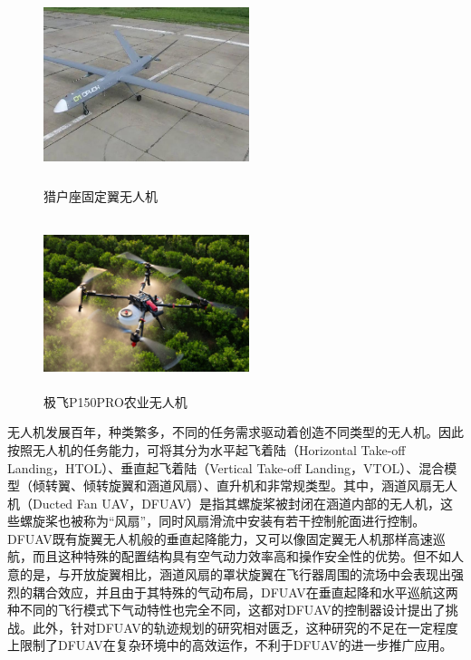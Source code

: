 \begin{figure}[htbp]
	\centering
	\begin{minipage}[c]{0.5\textwidth} %
		\centering
		\includegraphics[width=6cm,height=5cm]{Fig/Orion.jpg}
		\caption{\label{Orion}猎户座固定翼无人机}
	\end{minipage}%
	\begin{minipage}[c]{0.5\textwidth}
		\centering
		\includegraphics[width=6cm,height=5cm]{Fig/P150PRO.png}
		\caption{\label{P150PRO}极飞P150PRO农业无人机}
	\end{minipage}
\end{figure}

无人机发展百年，种类繁多，不同的任务需求驱动着创造不同类型的无人机。因此按照无人机的任务能力，可将其分为水平起飞着陆（Horizontal Take-off Landing，HTOL）、垂直起飞着陆（Vertical Take-off Landing，VTOL）、混合模型（倾转翼、倾转旋翼和涵道风扇）、直升机和非常规类型\cite{hassanalianClassificationsApplicationsDesign2017}。其中，涵道风扇无人机（Ducted Fan UAV，DFUAV）是指其螺旋桨被封闭在涵道内部的无人机，这些螺旋桨也被称为“风扇”，同时风扇滑流中安装有若干控制舵面进行控制。DFUAV既有旋翼无人机般的垂直起降能力，又可以像固定翼无人机那样高速巡航，而且这种特殊的配置结构具有空气动力效率高和操作安全性的优势\cite{johnsonModelingControlFlight2006b,zhangReviewDuctedFans2020b,qianImprovingPerformanceDucted2022,manzoor2022flight}。但不如人意的是，与开放旋翼相比，涵道风扇的罩状旋翼在飞行器周围的流场中会表现出强烈的耦合效应\cite{iiiNondimensionalModelingDuctedFan2012}，并且由于其特殊的气动布局，DFUAV在垂直起降和水平巡航这两种不同的飞行模式下气动特性也完全不同\cite{johnsonModelingControlFlight2006b}，这都对DFUAV的控制器设计提出了挑战。此外，针对DFUAV的轨迹规划的研究相对匮乏，这种研究的不足在一定程度上限制了DFUAV在复杂环境中的高效运作，不利于DFUAV的进一步推广应用。

